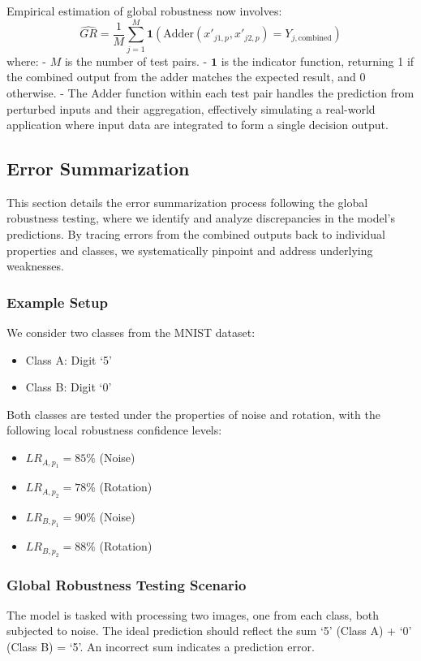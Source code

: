 \documentclass[10pt, conference, a4paper, final]{IEEEtran}
\begin{document}
        Empirical estimation of global robustness now involves:
        \begin{equation}
            \hat{GR} = \frac{1}{M} \sum_{j=1}^M \mathbf{1}(\text{Adder}(x'_{j1,p}, x'_{j2,p}) = Y_{j,\text{combined}})
        \end{equation}
        where:
        - \(M\) is the number of test pairs.
        - \(\mathbf{1}\) is the indicator function, returning 1 if the combined output from the adder matches the expected result, and 0 otherwise.
        - The \(\text{Adder}\) function within each test pair handles the prediction from perturbed inputs and their aggregation, effectively simulating a real-world application where input data are integrated to form a single decision output.
   
\subsection{Error Summarization}
This section details the error summarization process following the global robustness testing, where we identify and analyze discrepancies in the model's predictions. By tracing errors from the combined outputs back to individual properties and classes, we systematically pinpoint and address underlying weaknesses.

\subsubsection{Example Setup}
We consider two classes from the MNIST dataset:
\begin{itemize}
    \item Class A: Digit `5'
    \item Class B: Digit `0'
\end{itemize}
Both classes are tested under the properties of noise and rotation, with the following local robustness confidence levels:
\begin{itemize}
    \item \( LR_{A,p_1} = 85\% \) (Noise)
    \item \( LR_{A,p_2} = 78\% \) (Rotation)
    \item \( LR_{B,p_1} = 90\% \) (Noise)
    \item \( LR_{B,p_2} = 88\% \) (Rotation)
\end{itemize}

\subsubsection{Global Robustness Testing Scenario}
The model is tasked with processing two images, one from each class, both subjected to noise. The ideal prediction should reflect the sum `5' (Class A) + `0' (Class B) = `5'. An incorrect sum indicates a prediction error.
\end{document}
